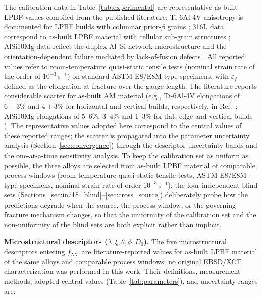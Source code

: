 \documentclass[twocolumn]{sagej}
\begin{document}
The calibration data in Table~\ref{tab:experimental} are representative as-built LPBF values compiled from the published literature: Ti-6Al-4V anisotropy is documented for LPBF builds with columnar prior-$\beta$ grains \cite{carroll2015anisotropic,wang2024metals_ti64}; 316L data correspond to as-built LPBF material with cellular sub-grain structures \cite{jaskari2021materials_316l}; AlSi10Mg data reflect the duplex Al--Si network microstructure and the orientation-dependent failure mediated by lack-of-fusion defects \cite{wu2023sci_alsi}. All reported values refer to room-temperature quasi-static tensile tests (nominal strain rate of the order of $10^{-3}$\,s$^{-1}$) on standard ASTM E8/E8M-type specimens, with $\varepsilon_f$ defined as the elongation at fracture over the gauge length. The literature reports considerable scatter for as-built AM material (e.g., Ti-6Al-4V elongations of $6\pm3\%$ and $4\pm3\%$ for horizontal and vertical builds, respectively, in Ref.~\cite{wang2024metals_ti64}; AlSi10Mg elongations of 5--6\%, 3--4\% and 1--3\% for flat, edge and vertical builds \cite{wu2023sci_alsi}). The representative values adopted here correspond to the central values of these reported ranges; the scatter is propagated into the parameter uncertainty analysis (Section~\ref{sec:convergence}) through the descriptor uncertainty bands and the one-at-a-time sensitivity analysis. To keep the calibration set as uniform as possible, the three alloys are selected from as-built LPBF material of comparable process windows (room-temperature quasi-static tensile tests, ASTM E8/E8M-type specimens, nominal strain rate of order $10^{-3}$\,s$^{-1}$); the four independent blind sets (Sections~\ref{sec:in718_blind}--\ref{sec:cross_source}) deliberately probe how the predictions degrade when the source, the process window, or the governing fracture mechanism changes, so that the uniformity of the calibration set and the non-uniformity of the blind sets are both explicit rather than implicit.

\textbf{Microstructural descriptors ($\lambda, \xi, \theta, \phi, D_0$).} The five microstructural descriptors entering $f_{\mathrm{AM}}$ are literature-reported values for as-built LPBF material of the same alloys and comparable process windows; no original EBSD/XCT characterization was performed in this work. Their definitions, measurement methods, adopted central values (Table~\ref{tab:parameters}), and uncertainty ranges are:
\end{document}
